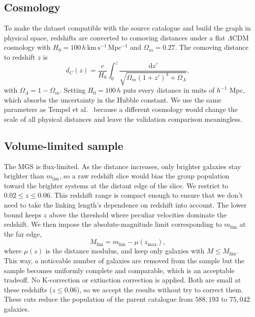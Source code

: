\documentclass[9pt,a4paper,twocolumn,twoside]{rho-class/rho}
\begin{document}
\subsection{Cosmology}

To make the dataset compatible with the source catalogue and build the graph in
physical space, redshifts are converted to comoving distances under a flat
$\Lambda$CDM cosmology with $H_0 = 100\,h\,\mathrm{km\,s^{-1}\,Mpc^{-1}}$ and
$\Omega_m = 0.27$. The comoving distance to redshift $z$ is
\begin{equation}\label{eq:comoving}
    d_C(z) = \frac{c}{H_0}\int_0^z
    \frac{\mathrm{d}z'}{\sqrt{\Omega_m(1+z')^3 + \Omega_\Lambda}},
\end{equation}
with $\Omega_\Lambda = 1 - \Omega_m$. Setting $H_0 = 100\,h$ puts every
distance in units of $h^{-1}$ Mpc, which absorbs the uncertainty in the Hubble
constant. We use the same parameters as Tempel et al.\ \cite{tempel2014} because
a different cosmology would change the scale of all physical distances and leave
the validation comparison meaningless.

\subsection{Volume-limited sample}

The MGS is flux-limited. As the distance increases, only brighter galaxies stay
brighter than $m_{\mathrm{lim}}$, so a raw redshift slice would bias the group
population toward the brighter systems at the distant edge of the slice. We
restrict to $0.02 \le z \le 0.06$. This redshift range is compact enough to
ensure that we don't need to take the linking length's dependence on redshift
into account. The lower bound keeps $z$ above the threshold where peculiar
velocities dominate the redshift. We then impose the absolute-magnitude limit
corresponding to $m_{\mathrm{lim}}$ at the far edge,
\begin{equation}\label{eq:Mlim}
    M_{\mathrm{lim}} = m_{\mathrm{lim}} - \mu(z_{\max}),
\end{equation}
where $\mu(z)$ is the distance modulus, and keep only galaxies with $M \le
M_{\mathrm{lim}}$. This way, a noticeable number of galaxies are removed from
the sample but the sample becomes uniformly complete and comparable, which is an
acceptable tradeoff. No K-correction or extinction correction is applied. Both
are small at these redshifts ($z \le 0.06$), so we accept the results without
try to correct them. These cuts reduce the population of the parent catalogue from
$588{,}193$ to $75{,}042$ galaxies.
\end{document}
